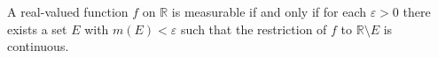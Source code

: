 A real-valued function $f$ on $\mathbb{R}$ is measurable if and only if for each $\varepsilon > 0$ there exists a set $E$ with $m(E) < \varepsilon$ such that the restriction of $f$ to $\mathbb{R} \setminus E$ is continuous.
